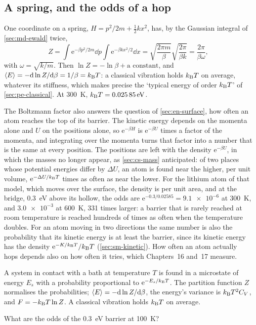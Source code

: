 \subsection*{A spring, and the odds of a hop}

One coordinate on a spring, $H = p^2/2m + \frac12kx^2$, has, by the
Gaussian integral of \cref{sec:md-ewald} twice,
\begin{equation*}
   Z = \int\mathrm{e}^{-\beta p^2/2m}\dd p\int\mathrm{e}^{-\beta kx^2/2}
   \dd x = \sqrt{\frac{2\pi m}{\beta}}\sqrt{\frac{2\pi}{\beta k}}
   = \frac{2\pi}{\beta\omega} ,
\end{equation*}
with $\omega = \sqrt{k/m}$. Then $\ln Z = -\ln\beta + \text{a constant}$,
and $\langle E \rangle = -\mathrm{d}\ln Z/\mathrm{d}\beta = 1/\beta = k_{\mathrm{B}} T$: a classical vibration holds
$k_{\mathrm{B}} T$ on average, whatever its stiffness, which makes precise the
`typical energy of order $k_{\mathrm{B}} T$' of \cref{sec:pe-classical}. At
\SI{300}{\kelvin}, $k_{\mathrm{B}} T = \SI{0.02585}{\electronvolt}$.

The Boltzmann factor also answers the question of \cref{sec:en-surface},
how often an atom reaches the top of its barrier. The kinetic energy
depends on the momenta alone and $U$ on the positions alone, so
$\mathrm{e}^{-\beta H}$ is $\mathrm{e}^{-\beta U}$ times a factor of the
momenta, and integrating over the momenta turns that factor into a number
that is the same at every position. The positions are left with the
density $\mathrm{e}^{-\beta U}$, in which the masses no longer appear, as
\cref{sec:cs-mass} anticipated: of two places whose potential energies
differ by $\Delta U$, an atom is found near the higher, per unit volume,
$\mathrm{e}^{-\Delta U/k_{\mathrm{B}} T}$ times as often as near the lower. For the
lithium atom of that model, which moves over the surface, the density is
per unit area, and at the bridge, \SI{0.3}{\electronvolt} above its
hollow, the odds are $\mathrm{e}^{-0.3/0.02585} = \num{9.1e-6}$ at
\SI{300}{\kelvin}, and $\num{3.0e-3}$ at \SI{600}{\kelvin}, 331 times
larger: a barrier that is rarely reached at room temperature is reached
hundreds of times as often when the temperature doubles. For an atom
moving in two directions the same number is also the probability that its
kinetic energy is at least the barrier, since its kinetic energy has the
density $\mathrm{e}^{-K/k_{\mathrm{B}} T}/k_{\mathrm{B}} T$ (\cref{sec:sm-kinetic}). How often an atom actually hops depends also on how
often it tries, which Chapters~16 and~17 measure.

\begin{keyidea}
A system in contact with a bath at temperature $T$ is found in a
microstate of energy $E_s$ with a probability proportional to
$\mathrm{e}^{-E_s/k_{\mathrm{B}} T}$. The partition function $Z$ normalises the
probabilities; $\langle E \rangle = -\mathrm{d}\ln Z/\mathrm{d}\beta$, the energy's variance is
$k_{\mathrm{B}} T^2C_V$, and $F = -k_{\mathrm{B}} T\ln Z$. A classical vibration holds $k_{\mathrm{B}} T$
on average.
\end{keyidea}


\begin{selfcheck}
What are the odds of the \SI{0.3}{\electronvolt} barrier at
\SI{100}{\kelvin}?
\end{selfcheck}
